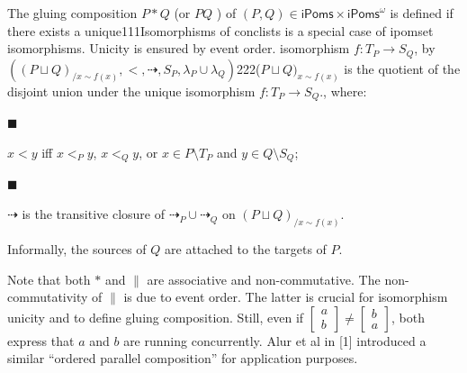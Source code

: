 \documentclass[10pt,a4paper]{article}
\begin{document}
 
 
The gluing composition $P*Q$ (or $PQ$ ) of $(P,Q)\in\mathsf{iPoms}\times{\mathsf{iPoms}^{\omega}}$ is defined if there exists a unique111Isomorphisms of conclists is a special case of ipomset isomorphisms. Unicity is ensured by event order. isomorphism $f\colon T_{P}\to S_{Q}$, by $((P\sqcup Q)_{/x\sim f(x)},<,\dashrightarrow,S_{P},\lambda_{P}\cup\lambda_{Q})$222($P\sqcup Q)_{x\sim f(x)}$ is the quotient of the disjoint union under the unique isomorphism $f:T_{P}\to S_{Q}$., where:\par
  
\par\noindent  $\blacksquare$ 
 
$x<y$ iff $x<_{P}y$, $x<_{Q}y$, or $x\in P\setminus T_{P}$ and $y\in Q\setminus S_{Q}$;\par
 
 
 
\par\noindent  $\blacksquare$ 
 
$\dashrightarrow$ is the transitive closure of $\dashrightarrow_{P}\cup\dashrightarrow_{Q}$ on $(P\sqcup Q)_{/x\sim f(x)}$.\par
 
 
  
Informally, the sources of $Q$ are attached to the targets of $P$.\par
 
 
 
Note that both $*$ and $\parallel$ are associative and non-commutative. The non-commutativity of $\parallel$ is due to event order. The latter is crucial for isomorphism unicity and to define gluing composition. Still, even if $\left[\begin{smallmatrix}a\\
b\end{smallmatrix}\right]\neq\left[\begin{smallmatrix}b\\
a\end{smallmatrix}\right]$, both express that $a$ and $b$ are running concurrently. Alur et al in [1] introduced a similar “ordered parallel composition” for application purposes.\par
 
 
\end{document}
